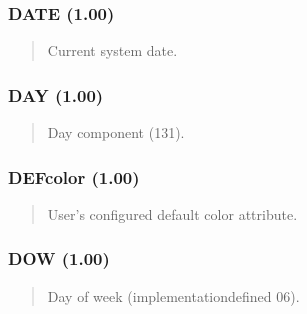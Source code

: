 \documentclass[letterpaper,10pt,english]{sphinxmanual}
\begin{document}
\subsubsection{DATE (1.00)}
\label{\detokenize{ppl:date-1-00}}\begin{quote}

\sphinxAtStartPar
{}
\begin{description}
\sphinxAtStartPar
Current system date.

\end{description}
\end{quote}


\subsubsection{DAY (1.00)}
\label{\detokenize{ppl:day-1-00}}\begin{quote}

\sphinxAtStartPar
{}
\begin{description}
\sphinxAtStartPar
Day component (1\textendash{}31).

\end{description}
\end{quote}


\subsubsection{DEFcolor (1.00)}
\label{\detokenize{ppl:defcolor-1-00}}\begin{quote}

\sphinxAtStartPar
{}
\begin{description}
\sphinxAtStartPar
User’s configured default color attribute.

\end{description}
\end{quote}


\subsubsection{DOW (1.00)}
\label{\detokenize{ppl:dow-1-00}}\begin{quote}

\sphinxAtStartPar
{}
\begin{description}
\sphinxAtStartPar
Day of week (implementation\sphinxhyphen{}defined 0\textendash{}6).

\end{description}
\end{quote}
\end{document}
